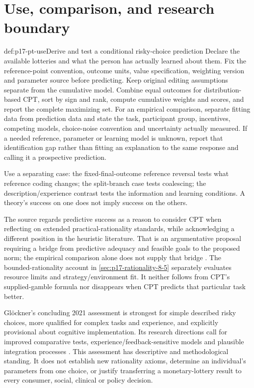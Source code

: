 \section{Use, comparison, and research boundary}

\begin{hbmethod}{def:p17-pt-use}{Derive and test a conditional risky-choice prediction}
Declare the available lotteries and what the person has actually
learned about them. Fix the reference-point convention, outcome
units, value specification, weighting version and parameter source
before predicting. Keep original editing assumptions separate from
the cumulative model. Combine equal outcomes for distribution-based
CPT, sort by sign and rank, compute cumulative weights and scores,
and report the complete maximizing set. For an empirical comparison,
separate fitting data from prediction data and state the task,
participant group, incentives, competing models, choice-noise
convention and uncertainty actually measured. If a needed reference,
parameter or learning model is unknown, report that identification
gap rather than fitting an explanation to the same response and
calling it a prospective prediction.

Use a separating case: the fixed-final-outcome reference reversal
tests what reference coding changes; the split-branch case tests
coalescing; the description/experience contrast tests the information
and learning conditions. A theory's success on one does not imply
success on the others.
\end{hbmethod}

The source regards predictive success as a reason to consider CPT
when reflecting on extended practical-rationality standards, while
acknowledging a different position in the heuristic literature. That
is an argumentative proposal requiring a bridge from predictive
adequacy and feasible goals to the proposed norm; the empirical
comparison alone does not supply that bridge
\cite[p.~489]{Glockner2021ProspectTheory}. The bounded-rationality
account in \cref{sec:p17-rationality-8-5} separately evaluates
resource limits and strategy/environment fit. It neither follows
from CPT's supplied-gamble formula nor disappears when CPT predicts
that particular task better.

Gl\"ockner's concluding 2021 assessment is strongest for simple
described risky choices, more qualified for complex tasks and
experience, and explicitly provisional about cognitive implementation.
Its research directions call for improved comparative tests,
experience/feedback-sensitive models and plausible integration
processes \cite[p.~491]{Glockner2021ProspectTheory}.
This assessment has descriptive and methodological standing. It
does not establish new rationality axioms, determine an individual's
parameters from one choice, or justify transferring a monetary-lottery
result to every consumer, social, clinical or policy decision.

